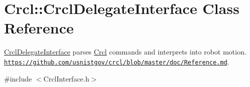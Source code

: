 \hypertarget{classCrcl_1_1CrclDelegateInterface}{\section{Crcl\-:\-:Crcl\-Delegate\-Interface Class Reference}
\label{classCrcl_1_1CrclDelegateInterface}
}


\hyperlink{classCrcl_1_1CrclDelegateInterface}{Crcl\-Delegate\-Interface} parses \hyperlink{namespaceCrcl}{Crcl} commands and interprets into robot motion. \href{https://github.com/usnistgov/crcl/blob/master/doc/Reference.md}{\tt https\-://github.\-com/usnistgov/crcl/blob/master/doc/\-Reference.\-md}.  




{\ttfamily \#include $<$Crcl\-Interface.\-h$>$}

